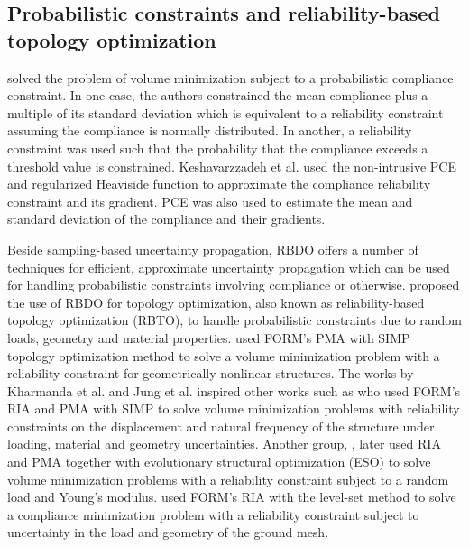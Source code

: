   \subsection{Probabilistic constraints and reliability-based topology optimization}

    \cite{Keshavarzzadeh2017} solved the problem of volume minimization subject to a probabilistic compliance constraint. In one case, the authors constrained the mean compliance plus a multiple of its standard deviation which is equivalent to a reliability constraint assuming the compliance is normally distributed. In another, a reliability constraint was used such that the probability that the compliance exceeds a threshold value is constrained. Keshavarzzadeh et al. used the non-intrusive PCE and regularized Heaviside function to approximate the compliance reliability constraint and its gradient. PCE was also used to estimate the mean and standard deviation of the compliance and their gradients.

    Beside sampling-based uncertainty propagation, RBDO offers a number of techniques for efficient, approximate uncertainty propagation which can be used for handling probabilistic constraints involving compliance or otherwise. \cite{Kharmanda2002,Kharmanda2004} proposed the use of RBDO for topology optimization, also known as reliability-based topology optimization (RBTO), to handle probabilistic constraints due to random loads, geometry and material properties. \cite{Jung2004} used FORM's PMA with SIMP topology optimization method to solve a volume minimization problem with a reliability constraint for geometrically nonlinear structures. The works by Kharmanda et al. and Jung et al. inspired other works such as \cite{Kim2006} who used FORM's RIA and PMA with SIMP to solve volume minimization problems with reliability constraints on the displacement and natural frequency of the structure under loading, material and geometry uncertainties. Another group, \cite{Kim2007,Kim2008}, later used RIA and PMA together with evolutionary structural optimization (ESO) \citep{YM1992,XY1998,Huang2010a} to solve volume minimization problems with a reliability constraint subject to a random load and Young's modulus. \cite{Ouyang2008} used FORM's RIA with the level-set method to solve a compliance minimization problem with a reliability constraint subject to uncertainty in the load and geometry of the ground mesh. 

